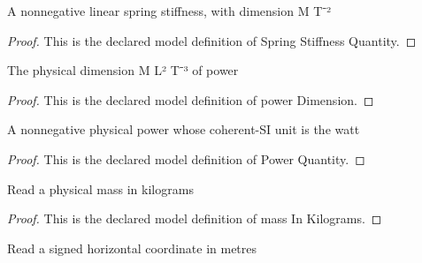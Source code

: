 \begin{definition}
  \label{def:physics:phyx-mini-0695:phyxminiproblems-problemphyxmini0695-springstiffnessquantity}
  A nonnegative linear spring stiffness, with dimension M T⁻²
\end{definition}
\begin{proof}
  This is the declared model definition of Spring Stiffness Quantity.
\end{proof}
\begin{definition}
  \label{def:physics:phyx-mini-0695:phyxminiproblems-problemphyxmini0695-powerdimension}
  The physical dimension M L² T⁻³ of power
\end{definition}
\begin{proof}
  This is the declared model definition of power Dimension.
\end{proof}
\begin{definition}
  \label{def:physics:phyx-mini-0695:phyxminiproblems-problemphyxmini0695-powerquantity}
  A nonnegative physical power whose coherent-SI unit is the watt
\end{definition}
\begin{proof}
  This is the declared model definition of Power Quantity.
\end{proof}
\begin{definition}
  \label{def:physics:phyx-mini-0695:phyxminiproblems-problemphyxmini0695-massinkilograms}
  Read a physical mass in kilograms
\end{definition}
\begin{proof}
  This is the declared model definition of mass In Kilograms.
\end{proof}
\begin{definition}
  \label{def:physics:phyx-mini-0695:phyxminiproblems-problemphyxmini0695-positioninmeters}
  Read a signed horizontal coordinate in metres
\end{definition}
